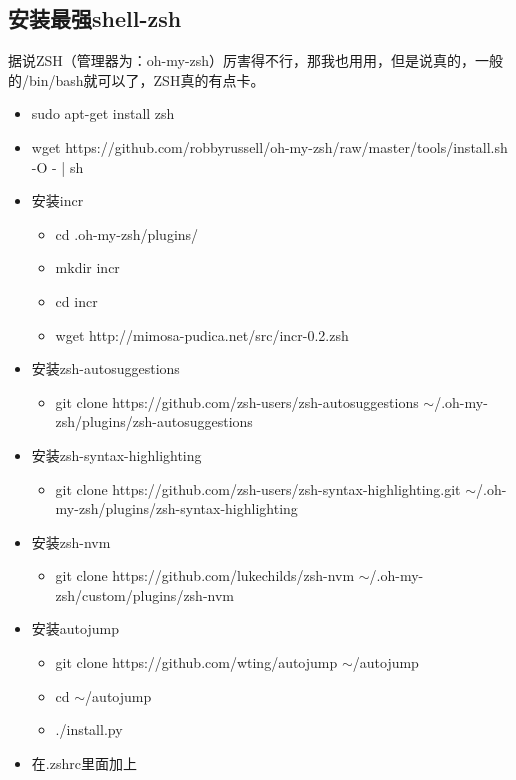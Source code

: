 \documentclass[utf8]{book}
\begin{document}
\begin{appendices}
	\section{安装最强shell-zsh}\label{u13}
	据说ZSH（管理器为：oh-my-zsh）厉害得不行，那我也用用，但是说真的，一般的/bin/bash就可以了，ZSH真的有点卡。
	\begin{itemize}
		\item sudo apt-get install zsh
		\item {\footnotesize wget https://github.com/robbyrussell/oh-my-zsh/raw/master/tools/install.sh -O - | sh}
		\item 安装incr
		\begin{itemize}
			\item cd .oh-my-zsh/plugins/
			\item mkdir incr
			\item cd incr
			\item wget http://mimosa-pudica.net/src/incr-0.2.zsh 
		\end{itemize}
		\item 安装zsh-autosuggestions
		\begin{itemize}
			\item {\footnotesize git clone https://github.com/zsh-users/zsh-autosuggestions  \quad$\sim$/.oh-my-zsh/plugins/zsh-autosuggestions}
		\end{itemize}
		\item 安装zsh-syntax-highlighting
		\begin{itemize}
			\item {\footnotesize git clone https://github.com/zsh-users/zsh-syntax-highlighting.git   \quad$\sim$/.oh-my-zsh/plugins/zsh-syntax-highlighting}
		\end{itemize}
		\item 安装zsh-nvm
		\begin{itemize}
			\item {\footnotesize git clone https://github.com/lukechilds/zsh-nvm  \quad$\sim$/.oh-my-zsh/custom/plugins/zsh-nvm}
		\end{itemize}
		\item 安装autojump
		\begin{itemize}
			\item git clone https://github.com/wting/autojump \quad $\sim$/autojump
			\item cd $\sim$/autojump
			\item ./install.py
		\end{itemize}
		\item 在.zshrc里面加上


\end{itemize}
\end{appendices}
\end{document}
